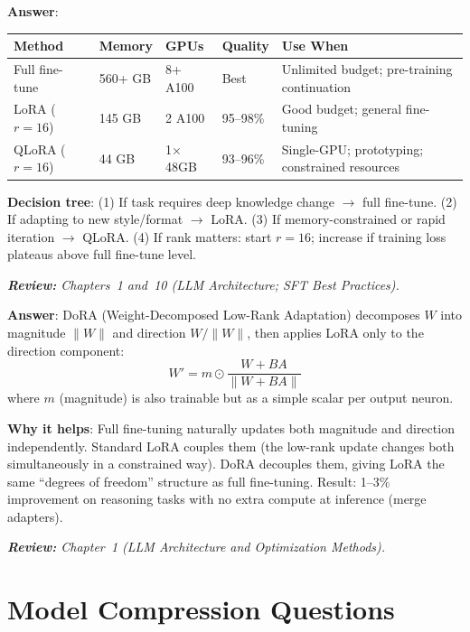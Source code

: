 \begin{questionbox}
\textbf{Answer}:

{\small
\begin{tabular}{@{}llllp{4.5cm}@{}}
\toprule
\textbf{Method} & \textbf{Memory} & \textbf{GPUs} & \textbf{Quality} & \textbf{Use When} \\
\midrule
Full fine-tune & 560+ GB & 8+ A100 & Best & Unlimited budget; pre-training continuation \\
LoRA ($r=16$) & 145 GB & 2 A100 & 95--98\% & Good budget; general fine-tuning \\
QLoRA ($r=16$) & 44 GB & 1$\times$48GB & 93--96\% & Single-GPU; prototyping; constrained resources \\
\bottomrule
\end{tabular}
}

\textbf{Decision tree}: (1) If task requires deep knowledge change $\to$ full fine-tune. (2) If adapting to new style/format $\to$ LoRA. (3) If memory-constrained or rapid iteration $\to$ QLoRA. (4) If rank matters: start $r=16$; increase if training loss plateaus above full fine-tune level.

\emph{\textbf{Review:} Chapters~1 and~10 (LLM Architecture; SFT Best Practices).}
\end{questionbox}

\begin{questionbox}
\textbf{Answer}: DoRA (Weight-Decomposed Low-Rank Adaptation) decomposes $W$ into magnitude $\|W\|$ and direction $W/\|W\|$, then applies LoRA only to the direction component: 
\[
W' = m \odot \frac{W + BA}{\|W + BA\|}
\]
 where $m$ (magnitude) is also trainable but as a simple scalar per output neuron.

\textbf{Why it helps}: Full fine-tuning naturally updates both magnitude and direction independently. Standard LoRA couples them (the low-rank update changes both simultaneously in a constrained way). DoRA decouples them, giving LoRA the same ``degrees of freedom'' structure as full fine-tuning. Result: 1--3\% improvement on reasoning tasks with no extra compute at inference (merge adapters).

\emph{\textbf{Review:} Chapter~1 (LLM Architecture and Optimization Methods).}
\end{questionbox}

\section{Model Compression Questions}
\label{model-compression-questions}

